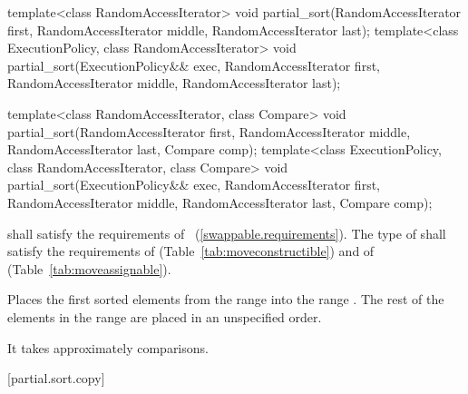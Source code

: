 %
\begin{itemdecl}
template<class RandomAccessIterator>
  void partial_sort(RandomAccessIterator first,
                    RandomAccessIterator middle,
                    RandomAccessIterator last);
template<class ExecutionPolicy, class RandomAccessIterator>
  void partial_sort(ExecutionPolicy&& exec,
                    RandomAccessIterator first,
                    RandomAccessIterator middle,
                    RandomAccessIterator last);

template<class RandomAccessIterator, class Compare>
  void partial_sort(RandomAccessIterator first,
                    RandomAccessIterator middle,
                    RandomAccessIterator last,
                    Compare comp);
template<class ExecutionPolicy, class RandomAccessIterator, class Compare>
  void partial_sort(ExecutionPolicy&& exec,
                    RandomAccessIterator first,
                    RandomAccessIterator middle,
                    RandomAccessIterator last,
                    Compare comp);

\end{itemdecl}

\begin{itemdescr}
\pnum
\requires
{} shall satisfy the requirements of
~(\ref{swappable.requirements}). The type
of  shall satisfy the requirements of
 (Table~\ref{tab:moveconstructible}) and of
 (Table~\ref{tab:moveassignable}).

\pnum
\effects
Places the first
sorted elements from the range
into the range
.
The rest of the elements in the range
are placed in an unspecified order.
%

\pnum
\complexity
It takes approximately
comparisons.
\end{itemdescr}

[partial.sort.copy]{}

